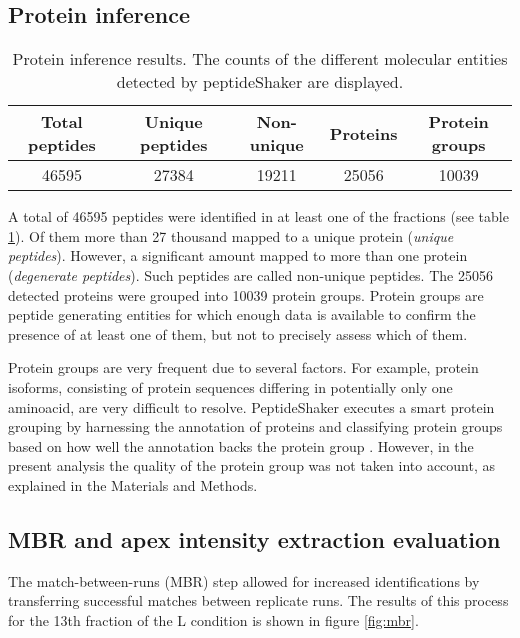 \subsection{Protein inference}

\begin{table}[H]
\begin{tabular}{ccccc}
  \toprule
 Total peptides & Unique peptides & Non-unique & Proteins & Protein groups \\ 
  \midrule
 46595 & 27384 & 19211 & 25056 & 10039 \\
 \bottomrule
\end{tabular}
\caption[Protein inference results]{Protein inference results. The counts of the different molecular entities detected by peptideShaker are displayed.}
\label{tab:protein_inference}
\end{table}

A total of 46595 peptides were identified in at least one of the fractions (see table \ref{tab:protein_inference}). Of them more than 27 thousand mapped to a unique protein (\textit{unique peptides}). However, a significant amount mapped to more than one protein (\textit{degenerate peptides}). Such peptides are called non-unique peptides. The 25056 detected proteins were grouped into 10039 protein groups. Protein groups are peptide generating entities for which enough data is available to confirm the presence of at least one of them, but not to precisely assess which of them.

Protein groups are very frequent due to several factors. For example, protein isoforms, consisting of protein sequences differing in potentially only one aminoacid, are very difficult to resolve. PeptideShaker executes a smart protein grouping by harnessing the annotation of proteins and classifying protein groups based on how well the annotation backs the protein group \cite{Vaudel2015}. However, in the present analysis the quality of the protein group was not taken into account, as explained in the Materials and Methods.


\subsection{MBR and apex intensity extraction evaluation}

The match-between-runs (\ac{MBR}) step allowed for increased identifications by transferring successful matches between replicate runs. The results of this process for the 13th fraction of the L condition is shown in figure \ref{fig:mbr}.

